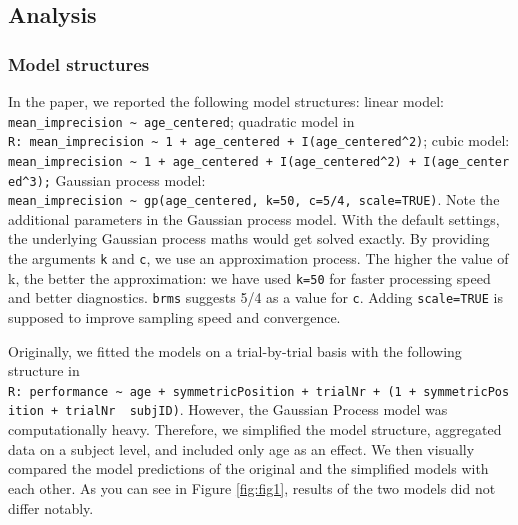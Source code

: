 \documentclass[
  man,floatsintext]{apa7}
\begin{document}
\hypertarget{analysis}{%
\subsection{Analysis}\label{analysis}}

\hypertarget{model-structures}{%
\subsubsection{Model structures}\label{model-structures}}

In the paper, we reported the following model structures: linear model: \texttt{mean\_imprecision\ \textasciitilde{}\ age\_centered}; quadratic model in \texttt{R:\ mean\_imprecision\ \textasciitilde{}\ 1\ +\ age\_centered\ +\ I(age\_centered\^{}2)}; cubic model: \texttt{mean\_imprecision\ \textasciitilde{}\ 1\ +\ age\_centered\ +\ I(age\_centered\^{}2)\ +\ I(age\_centered\^{}3);} Gaussian process model: \texttt{mean\_imprecision\ \textasciitilde{}\ gp(age\_centered,\ k=50,\ c=5/4,\ scale=TRUE)}. Note the additional parameters in the Gaussian process model. With the default settings, the underlying Gaussian process maths would get solved exactly. By providing the arguments \texttt{k} and \texttt{c}, we use an approximation process. The higher the value of k, the better the approximation: we have used \texttt{k=50} for faster processing speed and better diagnostics. \texttt{brms} suggests 5/4 as a value for \texttt{c}. Adding \texttt{scale=TRUE} is supposed to improve sampling speed and convergence.

Originally, we fitted the models on a trial-by-trial basis with the following structure in \texttt{R:\ performance\ \textasciitilde{}\ age\ +\ symmetricPosition\ +\ trialNr\ +\ (1\ +\ symmetricPosition\ +\ trialNr\ \textbar{}\ subjID)}. However, the Gaussian Process model was computationally heavy. Therefore, we simplified the model structure, aggregated data on a subject level, and included only age as an effect. We then visually compared the model predictions of the original and the simplified models with each other. As you can see in Figure \ref{fig:fig1}, results of the two models did not differ notably.
\end{document}

